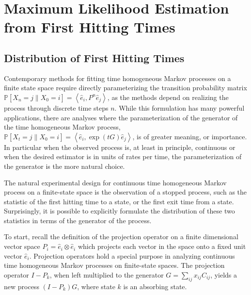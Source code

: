 \chapter{Maximum Likelihood Estimation from First Hitting Times}
\section{Distribution of First Hitting Times}
Contemporary methods for fitting time homogeneous Markov processes on a finite 
state space require directly parameterizing the transition probability matrix $\mathbb{P}\left[X_n = j \left\|X_0 = i \right.\right] = \left\langle \hat{e}_i, P^n \hat{e}_j \right\rangle$,
as the methods depend on realizing the process through discrete time steps $n$. While this 
formulation has many powerful applications, there are analyses where the parameterization of 
the generator of the time homogeneous Markov process, $\mathbb{P}\left[X_t = j \left\|X_0 = i \right.\right] = \left\langle \hat{e}_i, \exp\left({tG}\right) \hat{e}_j \right\rangle$, 
is of greater meaning, or importance. In particular when the observed process is, at least
in principle, continuous or when the desired estimator is in units of rates per time, the 
parameterization of the generator is the more natural choice.

The natural experimental design for continuous time homogeneous Markov process on a
finite-state space is the observation of a stopped process, such as the statistic of the 
first hitting time to a state, or the first exit time from a state. Surprisingly, it is 
possible to explicitly formulate the distribution of these two statistics in terms of the 
generator of the process.

To start, recall the definition of the projection operator on a finite dimensional vector
space $P_i = \hat{e}_i \otimes \hat{e}_i$ which projects each vector in the space onto a
fixed unit vector $\hat{e}_i$. Projection operators hold a special purpose in analyzing
continuous time homogeneous Markov processes on finite-state spaces. The projection operator
$I-P_k$, when left multiplied to the generator $G = \sum_{ij}x_{ij}C_{ij}$, yields a new 
process $\left(I-P_k\right)G$, where state $k$ is an absorbing state.

